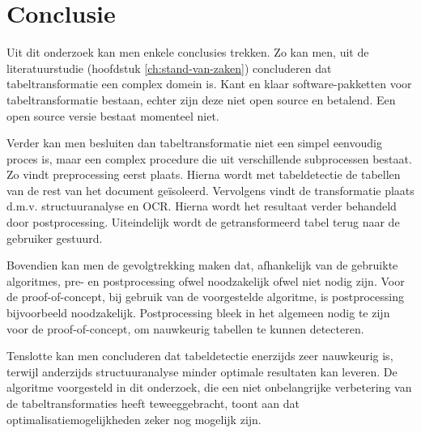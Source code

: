 
\chapter{Conclusie}
\label{ch:conclusie}


Uit dit onderzoek kan men enkele conclusies trekken. Zo kan men, uit de literatuurstudie (hoofdstuk \ref{ch:stand-van-zaken}) concluderen dat tabeltransformatie een complex domein is. Kant en klaar software-pakketten voor tabeltransformatie bestaan, echter zijn deze niet open source en betalend. Een open source versie bestaat momenteel niet.

Verder kan men besluiten dan tabeltransformatie niet een simpel eenvoudig proces is, maar een complex procedure die uit verschillende subprocessen bestaat. Zo vindt preprocessing eerst plaats. Hierna wordt met tabeldetectie de tabellen van de rest van het document geïsoleerd. Vervolgens vindt de transformatie plaats d.m.v. structuuranalyse en \Gls{OCR}. Hierna wordt het resultaat verder behandeld door postprocessing. Uiteindelijk wordt de getransformeerd tabel terug naar de gebruiker gestuurd.

Bovendien kan men de gevolgtrekking maken dat, afhankelijk van de gebruikte algoritmes, pre- en postprocessing ofwel noodzakelijk ofwel niet nodig zijn. Voor de proof-of-concept, bij gebruik van de voorgestelde algoritme, is postprocessing bijvoorbeeld noodzakelijk. Postprocessing bleek in het algemeen nodig te zijn voor de proof-of-concept, om nauwkeurig tabellen te kunnen detecteren.

Tenslotte kan men concluderen dat tabeldetectie enerzijds zeer nauwkeurig is, terwijl anderzijds structuuranalyse minder optimale resultaten kan leveren. De algoritme voorgesteld in dit onderzoek, die een niet onbelangrijke verbetering van de tabeltransformaties heeft teweeggebracht, toont aan dat optimalisatiemogelijkheden zeker nog mogelijk zijn.

